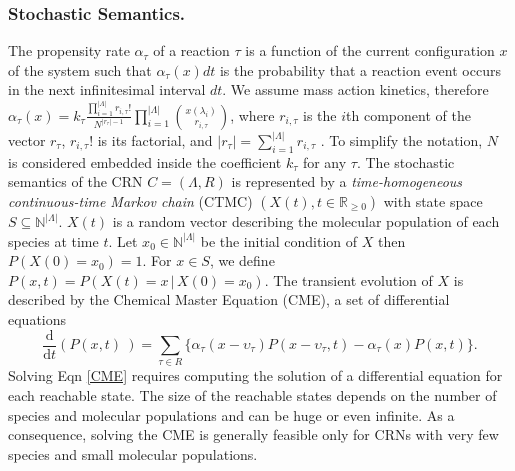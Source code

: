 \documentclass{llncs}
\begin{document}
\subsubsection{Stochastic Semantics.}
The propensity rate $\alpha_{\tau}$ of a reaction $\tau$ is a function of the current configuration $x$ of the system such that $\alpha_{\tau}(x)dt$ is the probability that a reaction event occurs in the next infinitesimal interval $dt$.
We assume mass action kinetics, therefore $\alpha_{\tau}(x)=k_{\tau}  \frac{\prod_{i=1}^{|\Lambda|} r_{i,\tau} !   }{N^{|r_{\tau}|-1}}\prod_{i=1}^{|\Lambda|} \binom{x(\lambda_i)}{r_{i,\tau}}$, where $r_{i,\tau}$ is the $i$th component of the vector $r_{\tau}$, $r_{i,\tau} !$ is its factorial, and $|r_{\tau}|=\sum_{i=1}^{|\Lambda|}r_{i,\tau}$  \cite{anderson2015models}.
To simplify  the notation, $N$ is considered embedded inside the coefficient $k_{\tau}$ for any $\tau$.
The stochastic semantics of the CRN $C=(\Lambda,R)$ is represented by a \emph{time-homogeneous continuous-time Markov chain} (CTMC) \cite{ethier2009markov} $(X(t),t \in \mathbb{R}_{\geq 0})$ with state space $S \subseteq \mathbb{N}^{|\Lambda|}$.
$X(t)$ is a random vector describing the molecular population of each species at time $t$.
Let $x_0 \in \mathbb{N}^{|\Lambda|}$ be the initial condition of $X$ then $P(X(0)=x_0)=1$. For $x \in S$, we define $P(x,t)=P(X(t)=x \,|\,X(0)=x_0)$.
The transient evolution of $X$ is described by the Chemical Master Equation (CME), a set of differential equations
\begin{equation}\label{CME}
\frac{\mathrm d}{\mathrm d t} \left( P(x,t)\ \right) = 
	\sum_{\tau \in R} \{ \alpha_{\tau}(x-\upsilon_{\tau})P(x-\upsilon_{\tau},t)-\alpha_{\tau}(x)P(x,t)\}. 
\end{equation}
Solving Eqn \eqref{CME} requires computing the solution of a differential equation for each reachable state. The size of the reachable states depends on the number of species and molecular populations and can be huge or even infinite. As a consequence, solving the CME is generally feasible only for CRNs with very few species and small molecular populations.
\end{document}
